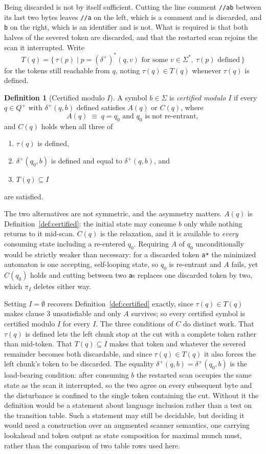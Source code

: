\documentclass[11pt,a4paper]{article}
\theoremstyle{definition}
\newtheorem{definition}{Definition}
\theoremstyle{plain}
\newcommand{\code}[1]{\texttt{#1}}
\begin{document}
Being discarded is not by itself sufficient. Cutting the line comment \code{//ab} between its last two bytes leaves
\code{//a} on the left, which is a comment and is discarded, and \code{b} on the right, which is an identifier and is
not. What is required is that both halves of the severed token are discarded, and that the restarted scan rejoins the
scan it interrupted. Write
\[
T(q) = \{\, \tau(p) \mid p = (\delta^+)^*(q, v) \text{ for some } v \in \Sigma^*,\ \tau(p) \text{ defined} \,\}
\]
for the tokens still reachable from $q$, noting $\tau(q) \in T(q)$ whenever $\tau(q)$ is defined.

\begin{definition}[Certified modulo $I$]
\label{def:trivia-certified}
A symbol $b \in \Sigma$ is \emph{certified modulo $I$} if every $q \in Q^+$ with $\delta^+(q, b)$ defined satisfies
$A(q)$ or $C(q)$, where
\[
A(q) \;\equiv\; q = q_0 \text{ and } q_0 \text{ is not re-entrant},
\]
and $C(q)$ holds when all three of
\begin{enumerate}
  \item $\tau(q)$ is defined,
  \item $\delta^+(q_0, b)$ is defined and equal to $\delta^+(q, b)$, and
  \item $T(q) \subseteq I$
\end{enumerate}
are satisfied.
\end{definition}

The two alternatives are not symmetric, and the asymmetry matters. $A(q)$ is Definition~\ref{def:certified}: the
initial state may consume $b$ only while nothing returns to it mid-scan. $C(q)$ is the relaxation, and it is available
to \emph{every} consuming state including a re-entered $q_0$. Requiring $A$ of $q_0$ unconditionally would be strictly
weaker than necessary: for a discarded token \code{a*} the minimized automaton is one accepting, self-looping state,
so $q_0$ is re-entrant and $A$ fails, yet $C(q_0)$ holds and cutting between two \code{a}s replaces one discarded
token by two, which $\pi_I$ deletes either way.

Setting $I = \emptyset$ recovers Definition~\ref{def:certified} exactly, since $\tau(q) \in T(q)$ makes clause 3
unsatisfiable and only $A$ survives; so every certified symbol is certified modulo $I$ for every $I$. The three
conditions of $C$ do distinct work. That $\tau(q)$ is defined lets the left chunk stop at the cut with a complete token
rather than mid-token. That $T(q) \subseteq I$ makes that token and whatever the severed remainder becomes both
discardable, and since $\tau(q) \in T(q)$ it also forces the left chunk's token to be discarded. The equality
$\delta^+(q, b) = \delta^+(q_0, b)$ is the load-bearing condition: after consuming $b$ the restarted scan occupies the
same state as the scan it interrupted, so the two agree on every subsequent byte and the disturbance is confined to the
single token containing the cut. Without it the definition would be a statement about language inclusion rather than a
test on the transition table. Such a statement may still be decidable, but deciding it would need a construction over an
augmented scanner semantics, one carrying lookahead and token output as state composition for maximal munch must, rather
than the comparison of two table rows used here.
\end{document}
